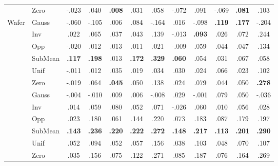 \begin{table}[!htbp]
\begin{tabular*}{\textwidth}{@{\extracolsep{\fill}} llcccccccccc @{}}
 & Zero & -.023 & .040 & \textbf{.008} & .031 & .058 & -.072 & .091 & -.069 & \textbf{.081} & .103 \\
\cline{1-12}
\multirow[t]{7}{*}{Wafer} & Gauss & -.060 & -.105 & .006 & .084 & -.164 & .016 & -.098 & \textbf{.119} & \textbf{.177} & -.204 \\
 & Inv & .022 & .065 & .037 & .043 & .139 & -.013 & \textbf{.093} & .026 & .072 & .244 \\
 & Opp & -.020 & .012 & .013 & .011 & .021 & -.009 & .059 & .044 & .047 & .134 \\
 & SubMean & \textbf{.117} & \textbf{.198} & .013 & \textbf{.172} & \textbf{.329} & \textbf{.060} & .054 & .031 & .067 & .058 \\
 & Unif & -.011 & .012 & .035 & .019 & .034 & .030 & .024 & .066 & .023 & .102 \\
 & Zero & -.019 & .064 & \textbf{.045} & .050 & .138 & .024 & .079 & .044 & .050 & \textbf{.278} \\
\cline{1-12}
\multirow[t]{7}{*}{ElecDev} & Gauss & -.004 & -.010 & .009 & .006 & -.008 & .029 & -.001 & .079 & .050 & -.036 \\
 & Inv & .014 & .059 & .080 & .052 & .071 & -.026 & .060 & .010 & .056 & .028 \\
 & Opp & .023 & .180 & .061 & .144 & .220 & .073 & .183 & .087 & .179 & .197 \\
 & SubMean & \textbf{.143} & \textbf{.236} & \textbf{.220} & \textbf{.222} & \textbf{.272} & \textbf{.148} & \textbf{.217} & \textbf{.113} & \textbf{.201} & \textbf{.290} \\
 & Unif & .052 & .094 & .052 & .057 & .156 & .038 & .103 & .048 & .070 & .107 \\
 & Zero & .035 & .156 & .075 & .122 & .271 & .085 & .187 & .076 & .164 & .269 \\
\cline{1-12}
\bottomrule
\end{tabular*}
\end{table}